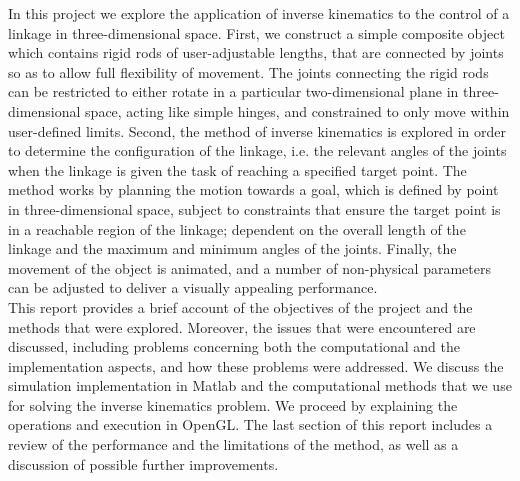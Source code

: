 \documentclass[paper=a4, fontsize=11pt]{scrartcl} %
\numberwithin{equation}{section} %
\numberwithin{figure}{section} %
\numberwithin{table}{section} %
\begin{document}
In this project we explore the application of inverse kinematics to the control of a linkage in three-dimensional space. First, we construct a simple composite object which contains rigid rods of user-adjustable lengths, that are connected by joints so as to allow full flexibility of movement. The joints connecting the rigid rods can be restricted to either rotate in a particular two-dimensional plane in three-dimensional space, acting like simple hinges, and constrained to only move within user-defined limits. Second, the method of inverse kinematics is explored in order to determine the configuration of the linkage, i.e. the relevant angles of the joints when the linkage is given the task of reaching a specified target point. The method works by planning the motion towards a goal, which is defined by point in three-dimensional space, subject to constraints that ensure the target point is in a reachable region of the linkage; dependent on the overall length of the linkage and the maximum and minimum angles of the joints. Finally, the movement of the object is animated, and a number of non-physical parameters can be adjusted to deliver a visually appealing performance. \\

This report provides a brief account of the objectives of the project and the methods that were explored. Moreover, the issues that were encountered are discussed, including problems concerning both the computational and the implementation aspects, and how these problems were addressed. We discuss the simulation implementation in Matlab and the computational methods that we use for solving the inverse kinematics problem. We proceed by explaining the operations and execution in OpenGL. The last section of this report includes a review of the performance and the limitations of the method, as well as a discussion of possible further improvements.


\end{document}
